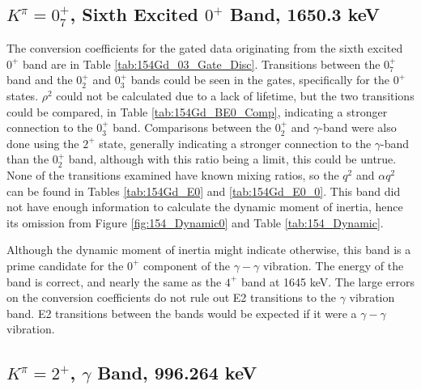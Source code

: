 



\subsection{$K^{\pi}=0^+_7$, Sixth Excited $0^+$ Band, 1650.3 keV}

The conversion coefficients for the gated data originating from the sixth excited $0^+$ band are in Table \ref{tab:154Gd_03_Gate_Disc}. Transitions between the $0^+_7$ band and the $0^+_2$ and $0^+_3$ bands could be seen in the gates, specifically for the $0^+$ states. $\rho^2$ could not be calculated due to a lack of lifetime, but the two transitions could be compared, in Table \ref{tab:154Gd_BE0_Comp}, indicating a stronger connection to the $0^+_3$ band. Comparisons between the $0^+_2$ and $\gamma$-band were also done using the $2^+$ state, generally indicating a stronger connection to the $\gamma$-band than the $0^+_2$ band, although with this ratio being a limit, this could be untrue. None of the transitions examined have known mixing ratios, so the $q^2$ and $\alpha q^2$ can be found in Tables \ref{tab:154Gd_E0} and \ref{tab:154Gd_E0_0}. This band did not have enough information to calculate the dynamic moment of inertia, hence its omission from Figure \ref{fig:154_Dynamic0} and Table \ref{tab:154_Dynamic}.

Although the dynamic moment of inertia might indicate otherwise, this band is a prime candidate for the $0^+$ component of the $\gamma-\gamma$ vibration. The energy of the band is correct, and nearly the same as the $4^+$ band at 1645 keV. The large errors on the conversion coefficients do not rule out E2 transitions to the $\gamma$ vibration band. E2 transitions between the bands would be expected if it were a $\gamma-\gamma$ vibration.



\subsection{$K^{\pi}=2^+$, $\gamma$ Band, 996.264 keV}

